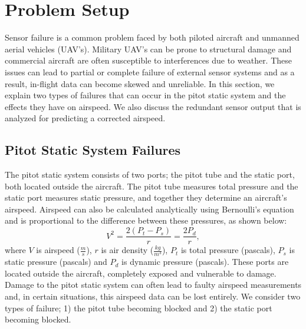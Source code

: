 \documentclass[]{aiaa-tc}
\begin{document}
\section{Problem Setup}
\label{sec:problem setup}
Sensor failure is a common problem faced by both piloted aircraft and unmanned aerial vehicles (UAV's). Military UAV's can be prone to structural damage and commercial aircraft are often susceptible to interferences due to weather. These issues can lead to partial or complete failure of external sensor systems and as a result, in-flight data can become skewed and unreliable. In this section, we explain two types of failures that can occur in the pitot static system and the effects they have on airspeed. We also discuss the redundant sensor output that is analyzed for predicting a corrected airspeed. 

\subsection{Pitot Static System Failures}

The pitot static system consists of two ports; the pitot tube and the static port, both located outside the aircraft. The pitot tube measures total pressure and the static port measures static pressure, and together they determine an aircraft's airspeed.  Airspeed can also be calculated analytically using Bernoulli's equation and is proportional to the difference between these pressures, as shown below:
\begin{equation}
\label{bern}
V^2 = \frac{2(P_t - P_s)}{r} = \frac{2P_d}{r},
\end{equation}
where $V$ is airspeed ($\frac{m}{s}$), $r$ is air density ($\frac{kg}{m^3}$), $P_t$ is total pressure (pascals), $P_s$ is static pressure (pascals) and $P_d$ is dynamic pressure (pascals). These ports are located outside the aircraft, completely exposed and vulnerable to damage. Damage to the pitot static system can often lead to faulty airspeed measurements and, in certain situations, this airspeed data can be lost entirely. We consider two types of failure; 1) the pitot tube becoming blocked and 2) the static port becoming blocked. 
\end{document}
